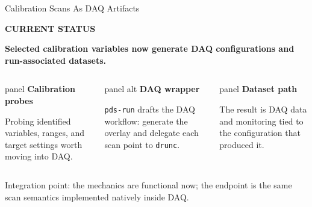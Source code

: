 \documentclass[aspectratio=169,10pt]{beamer}
\newcommand{\eyebrow}[1]{{\color{noircyan}\small\bfseries #1\par}}
\begin{document}
\begin{frame}[t]{Calibration Scans As DAQ Artifacts}
\vspace{-1mm}
\eyebrow{CURRENT STATUS}
{\color{white}\bfseries\fontsize{13.5}{16}\selectfont
Selected calibration variables now generate DAQ configurations and run-associated datasets. \par}

\vspace{2.5mm}
\begin{columns}[T,onlytextwidth]
\begin{beamercolorbox}[wd=\linewidth,sep=5pt,rounded=true]{panel}
\footnotesize
\textcolor{noircyan}{\textbf{Calibration probes}}\par
\vspace{0.4mm}
Probing identified variables, ranges, and target settings worth moving into DAQ.
\end{beamercolorbox}

\begin{beamercolorbox}[wd=\linewidth,sep=5pt,rounded=true]{panel alt}
\footnotesize
\textcolor{noircyan}{\textbf{DAQ wrapper}}\par
\vspace{0.4mm}
\texttt{pds-run} drafts the DAQ workflow: generate the overlay and delegate each scan point to \texttt{drunc}.
\end{beamercolorbox}

\begin{beamercolorbox}[wd=\linewidth,sep=5pt,rounded=true]{panel}
\footnotesize
\textcolor{noircyan}{\textbf{Dataset path}}\par
\vspace{0.4mm}
The result is DAQ data and monitoring tied to the configuration that produced it.
\end{beamercolorbox}
\end{columns}

\vspace{2mm}
{\color{noirmuted}\scriptsize
Integration point: the mechanics are functional now; the endpoint is the same scan semantics implemented natively inside DAQ.\par}
\end{frame}
\end{document}
